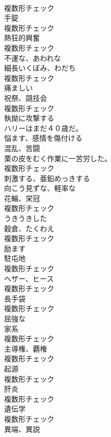\documentclass[8pt]{extreport}
\begin{document}
\begin{CJK}{UTF8}{min}
\\	複数形チェック
\\	[名詞]	手錠	
\\	複数形チェック
\\	[名詞]	熱狂的興奮	
\\	複数形チェック
\\	[形容詞]	不運な、あわれな	
\\	[名詞]	細⻑いくぼみ、わだち	
\\	複数形チェック
\\	[形容詞]	痛ましい	
\\	[名詞]	祝祭、競技会	
\\	複数形チェック
\\	[動詞]	執拗に攻撃する	
\\	ハリーはまだ４０歳だ。	
\\	[動詞]	悩ます、感情を傷付ける	
\\	[名詞]	混乱、苦闘	
\\	栗の皮をむく作業に一苦労した。	
\\	複数形チェック
\\	[動詞]	刺激する、亜鉛めっきする	
\\	[形容詞]	向こう見ずな、軽率な	
\\	[名詞]	花輪、栄冠	
\\	複数形チェック
\\	[形容詞]	うきうきした	
\\	[名詞]	穀倉、たくわえ	
\\	複数形チェック
\\	[動詞]	励ます	
\\	[名詞]	駐屯地	
\\	複数形チェック
\\	[名詞]	ヘザー、ヒース	
\\	複数形チェック
\\	[名詞]	⻑手袋	
\\	複数形チェック
\\	[形容詞]	屈強な	
\\	[名詞]	家系	
\\	複数形チェック
\\	[名詞]	主導権、覇権	
\\	複数形チェック
\\	[名詞]	起源	
\\	複数形チェック
\\	[名詞]	肝炎	
\\	複数形チェック
\\	[名詞]	遺伝学	
\\	複数形チェック
\\	[名詞]	異端、異説	

\end{CJK}
\end{document}
